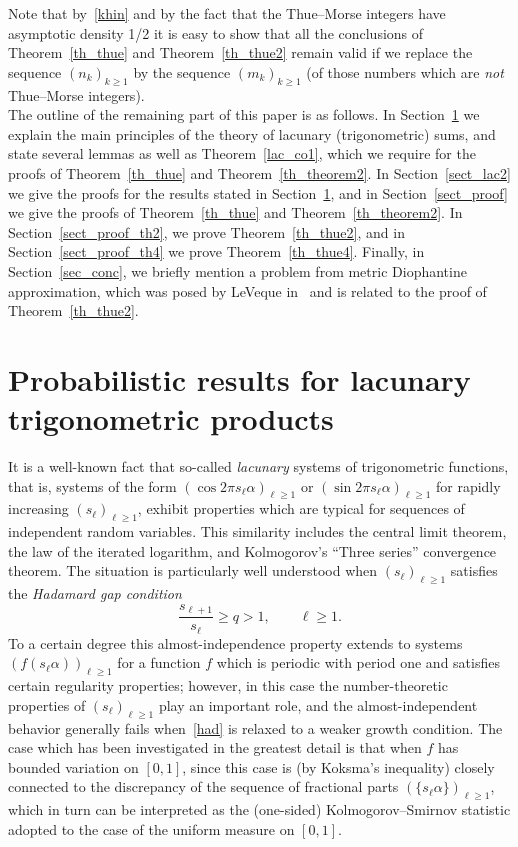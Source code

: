 \documentclass[12pt]{amsart}
\begin{document}
Note that by~\eqref{khin} and by the fact that the Thue--Morse integers have asymptotic density 1/2 it is easy to show that all the conclusions of Theorem~\ref{th_thue} and Theorem~\ref{th_thue2} remain valid if we replace the sequence $(n_k)_{k \geq 1}$ by the sequence $(m_k)_{k \geq 1}$ (of those numbers which are \emph{not} Thue--Morse integers).\\

The outline of the remaining part of this paper is as follows. In Section~\ref{sect_lac} we explain the main principles of the theory of lacunary (trigonometric) sums, and state several lemmas as well as Theorem~\ref{lac_co1}, which we require for the proofs of Theorem~\ref{th_thue} and Theorem~\ref{th_theorem2}. In Section~\ref{sect_lac2} we give the proofs for the results stated in Section~\ref{sect_lac}, and in Section~\ref{sect_proof} we give the proofs of Theorem~\ref{th_thue} and Theorem~\ref{th_theorem2}. In Section~\ref{sect_proof_th2}, we prove Theorem~\ref{th_thue2}, and in Section~\ref{sect_proof_th4} we prove Theorem~\ref{th_thue4}. Finally, in Section~\ref{sec_conc}, we briefly mention a problem from metric Diophantine approximation, which was posed by LeVeque in~\cite{LeVe} and is related to the proof of Theorem~\ref{th_thue2}.

\section{Probabilistic results for lacunary trigonometric products} \label{sect_lac}

It is a well-known fact that so-called \emph{lacunary} systems of trigonometric
functions, that is, systems of the form $(\cos 2 \pi s_\ell \alpha)_{\ell \geq 1}$ or
$(\sin 2 \pi s_\ell \alpha)_{\ell \geq 1}$ for rapidly increasing $(s_\ell)_{\ell \geq 1}$,
exhibit properties which are typical for sequences of independent random variables. This similarity includes the central limit theorem, the law of the iterated logarithm, and Kolmogorov's ``Three series'' convergence theorem. The situation is particularly well understood when $(s_\ell)_{\ell \geq 1}$ satisfies the \emph{Hadamard gap condition} 
\begin{equation} \label{had}
\frac{s_{\ell+1}}{s_\ell} \geq q > 1, \qquad \ell \geq 1.
\end{equation}
To a certain degree this almost-independence property extends to systems $(f(s_\ell \alpha))_{\ell \geq 1}$ for a function $f$ which is periodic with period one and satisfies certain regularity properties; however, in this case the number-theoretic properties of $(s_\ell)_{\ell \geq 1}$ play an important role, and the almost-independent behavior generally fails when~\eqref{had} is relaxed to a weaker growth condition. The case which has been investigated in the greatest detail is that when $f$ has bounded variation on $[0,1]$, since this case is (by Koksma's inequality) closely connected to the discrepancy of the sequence of fractional parts $(\{s_\ell \alpha\})_{\ell \geq 1}$, which in turn can be interpreted as the (one-sided) Kolmogorov--Smirnov statistic adopted to the case of the uniform measure on $[0,1]$.\\
\end{document}
